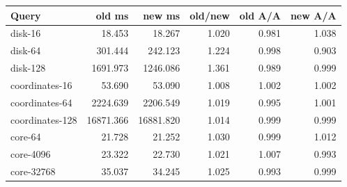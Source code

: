 \begin{center}\small
\begin{tabular}{@{}lrrrrr@{}}
\toprule
Query & old ms & new ms & old/new & old A/A & new A/A \\
\midrule
disk-16 & 18.453 & 18.267 & 1.020 & 0.981 & 1.038 \\
disk-64 & 301.444 & 242.123 & 1.224 & 0.998 & 0.903 \\
disk-128 & 1691.973 & 1246.086 & 1.361 & 0.989 & 0.999 \\
coordinates-16 & 53.690 & 53.090 & 1.008 & 1.002 & 1.002 \\
coordinates-64 & 2224.639 & 2206.549 & 1.019 & 0.995 & 1.001 \\
coordinates-128 & 16871.366 & 16881.820 & 1.014 & 0.999 & 0.999 \\
core-64 & 21.728 & 21.252 & 1.030 & 0.999 & 1.012 \\
core-4096 & 23.322 & 22.730 & 1.021 & 1.007 & 0.993 \\
core-32768 & 35.037 & 34.245 & 1.025 & 0.993 & 0.999 \\
\bottomrule
\end{tabular}
\end{center}
